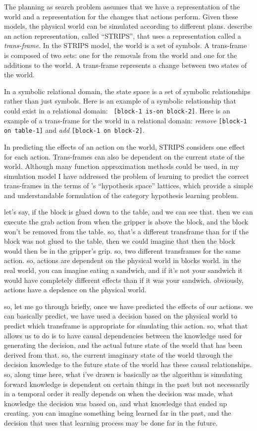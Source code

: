 The planning as search problem assumes that we have a representation
of the world and a representation for the changes that actions
perform.  Given these models, the physical world can be simulated
according to different plans.  \cite{fikes:1972} describe an action
representation, called ``STRIPS'', that uses a representation called a
\emph{trans-frame}.  In the STRIPS model, the world is a set of
symbols.  A trans-frame is composed of two sets: one for the removals
from the world and one for the additions to the world.  A trans-frame
represents a change between two states of the world.

In a symbolic relational domain, the state space is a set of symbolic
relationships rather than just symbols.  Here is an example of a
symbolic relationship that could exist in a relational domain: {\tt
  [block-1 is-on block-2]}.  Here is an example of a trans-frame for
the world in a relational domain: \emph{remove} {\tt [block-1 on
    table-1]} and \emph{add} {\tt [block-1 on block-2]}.

In predicting the effects of an action on the world, STRIPS considers
one effect for each action.  Trans-frames can also be dependent on the
current state of the world.  Although many function approximation
methods could be used, in my simulation model I have addressed the
problem of learning to predict the correct trans-frames in the terms
of \cite{mitchell:1982}'s ``hypothesis space'' lattices, which provide
a simple and understandable formulation of the category hypothesis
learning problem.

let's say, if the block is glued down to the table, and we can see that.
then we can execute the grab action from when the gripper is above the block, and the block won't be removed from the table.
so, that's a different transframe than for if the block was not glued to the table, then we could imagine that then the block would then be in the gripper's grip.
so, two different transframes for the same action.
so, actions are dependent on the physical world in blocks world.
in the real world, you can imagine eating a sandwich, and if it's not your sandwich it would have completely different effects than if it was your sandwich.
obviously, actions have a depdence on the physical world.

so, let me go through briefly, once we have predicted the effects of our actions.
we can basically predict, we have used a decision based on the physical world to predict which transframe is appropriate for simulating this action.
so, what that allows us to do is to have causal dependencies between the knowledge used for generating the decision, and the actual future state of the world that has been derived from that.
so, the current imaginary state of the world through the decision knowledge to the future state of the world has these causal relationships.
so, along time here, what i've drawn is basically as the algorithm is simulating forward knowledge is dependent on certain things in the past but not necessarily in a temporal order it really depends on when the decision was made, what knowledge the decision was based on, and what knowledge that ended up creating.
you can imagine something being learned far in the past, and the decision that uses that learning process may be done far in the future.

